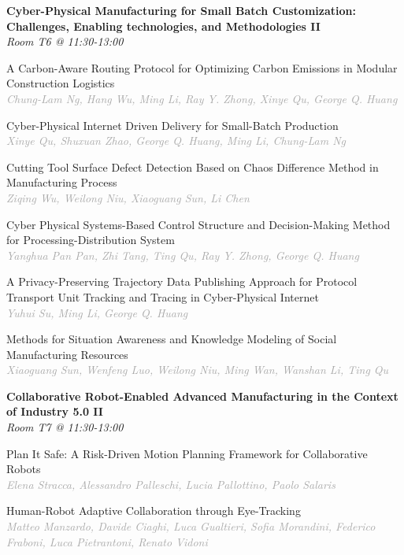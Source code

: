 \begin{multicols*}{2}
\normalsize \textbf{Cyber-Physical Manufacturing for Small Batch Customization: Challenges, Enabling technologies, and Methodologies II}\\
\small \textit{Room T6 @ 11:30-13:00}

\small A Carbon-Aware Routing Protocol for Optimizing Carbon Emissions in Modular Construction Logistics\\ 
\footnotesize \textcolor{darkgray}{\textit{Chung-Lam Ng, Hang  Wu, Ming  Li, Ray Y.  Zhong, Xinye  Qu, George Q.  Huang}}

\small Cyber-Physical Internet Driven Delivery for Small-Batch Production\\ 
\footnotesize \textcolor{darkgray}{\textit{Xinye Qu, Shuxuan  Zhao, George Q.  Huang, Ming  Li, Chung-Lam  Ng}}

\small Cutting Tool Surface Defect Detection Based on Chaos Difference Method in Manufacturing Process\\ 
\footnotesize \textcolor{darkgray}{\textit{Ziqing Wu, Weilong  Niu, Xiaoguang  Sun, Li  Chen}}

\small Cyber Physical Systems-Based Control Structure and Decision-Making Method for Processing-Distribution System\\ 
\footnotesize \textcolor{darkgray}{\textit{Yanghua Pan Pan, Zhi  Tang, Ting  Qu, Ray Y.  Zhong, George Q.  Huang}}

\small A Privacy-Preserving Trajectory Data Publishing Approach for Protocol Transport Unit Tracking and Tracing in Cyber-Physical Internet\\ 
\footnotesize \textcolor{darkgray}{\textit{Yuhui Su, Ming  Li, George Q.  Huang}}

\small Methods for Situation Awareness and Knowledge Modeling of Social Manufacturing Resources\\ 
\footnotesize \textcolor{darkgray}{\textit{Xiaoguang Sun, Wenfeng  Luo, Weilong  Niu, Ming  Wan, Wanshan  Li, Ting  Qu}}

\normalsize \textbf{Collaborative Robot-Enabled Advanced Manufacturing in the Context of Industry 5.0 II}\\
\small \textit{Room T7 @ 11:30-13:00}

\small Plan It Safe: A Risk-Driven Motion Planning Framework for Collaborative Robots\\ 
\footnotesize \textcolor{darkgray}{\textit{Elena Stracca, Alessandro  Palleschi, Lucia  Pallottino, Paolo  Salaris}}

\small Human-Robot Adaptive Collaboration through Eye-Tracking\\ 
\footnotesize \textcolor{darkgray}{\textit{Matteo Manzardo, Davide  Ciaghi, Luca  Gualtieri, Sofia  Morandini, Federico  Fraboni, Luca  Pietrantoni, Renato  Vidoni}}


\end{multicols*}
